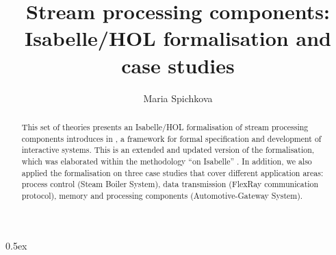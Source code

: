 \documentclass[11pt,a4paper]{article}
\begin{document}


\title{Stream processing components:\\ Isabelle/HOL formalisation and case studies}
\author{Maria Spichkova}
\maketitle


\begin{abstract}
This set of theories presents an Isabelle/HOL formalisation of stream processing components introduces in %
  \Focus, 
a framework for formal specification and development of interactive systems.
This is an extended and updated version of the formalisation, which was 
elaborated within the methodology ``\Focus on Isabelle'' \cite{spichkova}. 
In addition, we also applied the formalisation on three case studies 
that cover different application areas: 
process control (Steam Boiler System),
data transmission (FlexRay communication protocol),  
memory and processing components (Automotive-Gateway System). 
\end{abstract}
\tableofcontents

\newpage



\parindent 0pt\parskip 0.5ex

\newpage




\end{document}
